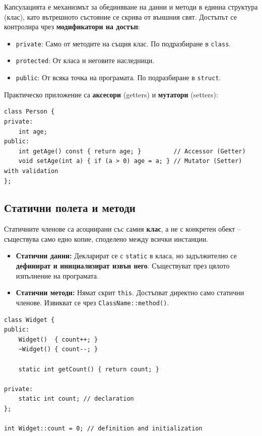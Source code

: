 \documentclass{scrartcl}
\begin{document}
\begin{FlushLeft}
Капсулацията е механизмът за обединяване на данни и методи в единна структура (клас), като вътрешното състояние се скрива от външния свят. Достъпът се контролира чрез \textbf{модификатори на достъп}:

\begin{itemize}
    \item \texttt{private}: Само от методите на същия клас. По подразбиране в \texttt{class}.
    \item \texttt{protected}: От класа и неговите наследници.
    \item \texttt{public}: От всяка точка на програмата. По подразбиране в \texttt{struct}.
\end{itemize}

Практическо приложение са \textbf{аксесори} (getters) и \textbf{мутатори} (setters):

\begin{lstlisting}
class Person {
private:
    int age;
public:
    int getAge() const { return age; }         // Accessor (Getter)
    void setAge(int a) { if (a > 0) age = a; } // Mutator (Setter) with validation
};
\end{lstlisting}

\subsection{Статични полета и методи}

Статичните членове са асоциирани със самия \textbf{клас}, а не с конкретен обект -- съществува само едно копие, споделено между всички инстанции.

\begin{itemize}
    \item \textbf{Статични данни:} Декларират се с \texttt{static} в класа, но задължително се \textbf{дефинират и инициализират извън него}. Съществуват през цялото изпълнение на програмата.
    \item \textbf{Статични методи:} Нямат скрит \texttt{this}. Достъпват директно само статични членове. Извикват се чрез \texttt{ClassName::method()}.
\end{itemize}

\begin{lstlisting}
class Widget {
public:
    Widget()  { count++; }
    ~Widget() { count--; }

    static int getCount() { return count; }

private:
    static int count; // declaration
};

int Widget::count = 0; // definition and initialization


\end{lstlisting}
\end{FlushLeft}
\end{document}
